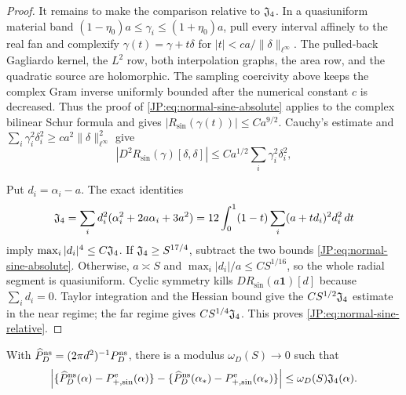 \begin{proof}
It remains to make the comparison relative to $\mathfrak J_4$.  In a
quasiuniform material band
$(1-\eta_0)a\le\gamma_i\le(1+\eta_0)a$, pull every interval affinely to
the real fan and complexify
$\gamma(t)=\gamma+t\delta$ for
$|t|<ca/\|\delta\|_{\ell^\infty}$.  The pulled-back Gagliardo kernel, the
$L^2$ row, both interpolation graphs, the area row, and the quadratic
source are holomorphic.  The sampling coercivity above keeps the complex
Gram inverse uniformly bounded after the numerical constant $c$ is
decreased.  Thus the proof of \eqref{JP:eq:normal-sine-absolute} applies to
the complex bilinear Schur formula and gives
$|R_{\sin}(\gamma(t))|\le Ca^{9/2}$.  Cauchy's estimate and
$\sum_i\gamma_i^2\delta_i^2\ge ca^2
\|\delta\|_{\ell^\infty}^2$ give
\[
 |D^2R_{\sin}(\gamma)[\delta,\delta]|
 \le Ca^{1/2}\sum_i\gamma_i^2\delta_i^2,
\]

Put $d_i=\alpha_i-a$.  The exact identities
\[
 \mathfrak J_4=\sum_i d_i^2(\alpha_i^2+2a\alpha_i+3a^2)
 =12\int_0^1(1-t)\sum_i(a+td_i)^2d_i^2\,dt
\]
imply $\max_i|d_i|^4\le C\mathfrak J_4$.  If
$\mathfrak J_4\ge S^{17/4}$, subtract the two bounds
\eqref{JP:eq:normal-sine-absolute}.  Otherwise, $a\asymp S$ and
$\max_i|d_i|/a\le CS^{1/16}$, so the whole radial segment is
quasiuniform.  Cyclic symmetry kills
$DR_{\sin}(a\mathbf1)[d]$ because $\sum_i d_i=0$.  Taylor integration and
the Hessian bound give the $CS^{1/2}\mathfrak J_4$ estimate in the near regime;
the far regime gives $CS^{1/4}\mathfrak J_4$.  This proves
\eqref{JP:eq:normal-sine-relative}.
\end{proof}

\begin{lemma}
\label{JP:lem:normal-bessel-secant}
With $\widehat P_D^{\rm ns}=(2\pi d^2)^{-1}P_D^{\rm ns}$, there is a
modulus $\omega_D(S)\to0$ such that
\begin{equation}\label{JP:eq:normal-bessel-secant-relative}
 \left|\{\widehat P_D^{\rm ns}(\alpha)-P_{+,\sin}^{\rm e}(\alpha)\}
 -\{\widehat P_D^{\rm ns}(\alpha_*)-P_{+,\sin}^{\rm e}(\alpha_*)\}\right|
 \le\omega_D(S)\mathfrak J_4(\alpha).
\end{equation}
\end{lemma}

